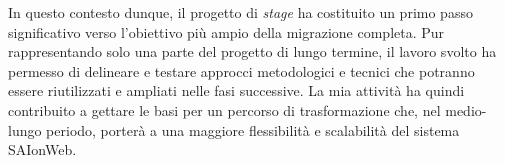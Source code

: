      \vspace{0.2 em}
     \noindent In questo contesto dunque, il progetto di \textit{stage} ha costituito un primo passo significativo verso l'obiettivo più ampio della migrazione completa. Pur rappresentando solo una parte del progetto di lungo termine, il lavoro svolto ha permesso di delineare e testare approcci metodologici e tecnici che potranno essere riutilizzati e ampliati nelle fasi successive. La mia attività ha quindi contribuito a gettare le basi per un percorso di trasformazione che, nel medio-lungo periodo, porterà a una maggiore flessibilità e scalabilità del sistema SAIonWeb.
    
    
    